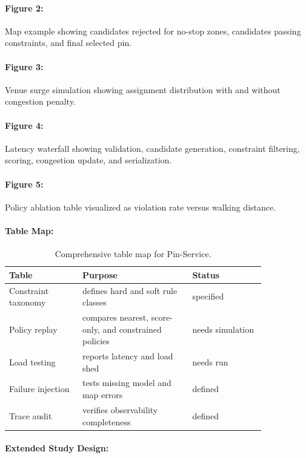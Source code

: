 \documentclass{article}
\begin{document}
\paragraph{Figure 2:}
Map example showing candidates rejected for no-stop zones, candidates passing constraints, and final selected pin.

\paragraph{Figure 3:}
Venue surge simulation showing assignment distribution with and without congestion penalty.

\paragraph{Figure 4:}
Latency waterfall showing validation, candidate generation, constraint filtering, scoring, congestion update, and serialization.

\paragraph{Figure 5:}
Policy ablation table visualized as violation rate versus walking distance.

\paragraph{Table Map:}

\begin{table}[t]
\centering
\caption{Comprehensive table map for Pin-Service.}
\begin{tabular}{@{}p{0.24\linewidth}p{0.36\linewidth}p{0.24\linewidth}@{}}
\toprule
\textbf{Table} & \textbf{Purpose} & \textbf{Status}\\
\midrule
Constraint taxonomy & defines hard and soft rule classes & specified\\
Policy replay & compares nearest, score-only, and constrained policies & needs simulation\\
Load testing & reports latency and load shed & needs run\\
Failure injection & tests missing model and map errors & defined\\
Trace audit & verifies observability completeness & defined\\
\bottomrule
\end{tabular}
\end{table}

\paragraph{Extended Study Design:}
\end{document}
